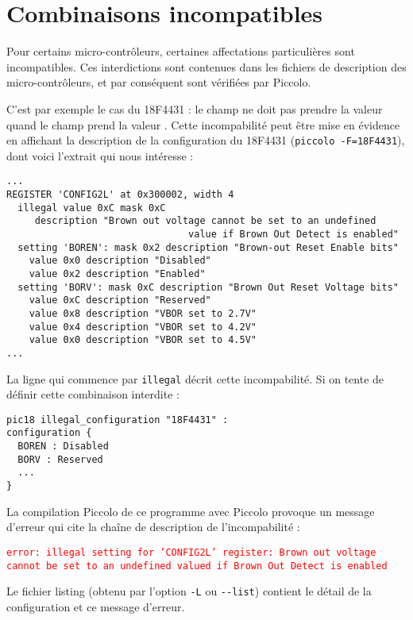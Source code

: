 \section{Combinaisons incompatibles}


Pour certains micro-contrôleurs, certaines affectations particulières sont incompatibles. Ces interdictions sont contenues dans les fichiers de description des micro-contrôleurs, et par conséquent sont vérifiées par Piccolo. 

C’est par exemple le cas du 18F4431 : le champ  ne doit pas prendre la valeur  quand le champ  prend la valeur . Cette incompabilité peut être mise en évidence en affichant la description de la configuration du 18F4431 (\texttt{piccolo -F=18F4431}), dont voici l'extrait qui nous intéresse :
\begin{lstlisting}[frame=l, language=assembleur]
...
REGISTER 'CONFIG2L' at 0x300002, width 4
  illegal value 0xC mask 0xC
     description "Brown out voltage cannot be set to an undefined 
                                value if Brown Out Detect is enabled"
  setting 'BOREN': mask 0x2 description "Brown-out Reset Enable bits"
    value 0x0 description "Disabled"
    value 0x2 description "Enabled"
  setting 'BORV': mask 0xC description "Brown Out Reset Voltage bits"
    value 0xC description "Reserved"
    value 0x8 description "VBOR set to 2.7V"
    value 0x4 description "VBOR set to 4.2V"
    value 0x0 description "VBOR set to 4.5V"
...
\end{lstlisting}


La ligne qui commence par \texttt{illegal} décrit cette incompabilité. Si on tente de définir cette combinaison interdite :
\begin{lstlisting}[language=piccolo]
pic18 illegal_configuration "18F4431" :
configuration {
  BOREN : Disabled
  BORV : Reserved
  ...
}
\end{lstlisting}

La compilation Piccolo de ce programme avec Piccolo provoque un message d’erreur qui cite la chaîne de description de l'incompabilité :


\textcolor{red}{\tt error: illegal setting for 'CONFIG2L' register: Brown out voltage cannot be set to an undefined valued if Brown Out Detect is enabled}

Le fichier listing (obtenu par l’option \texttt{-L} ou \texttt{-{}-list}) contient le détail de la configuration et ce message d’erreur.

